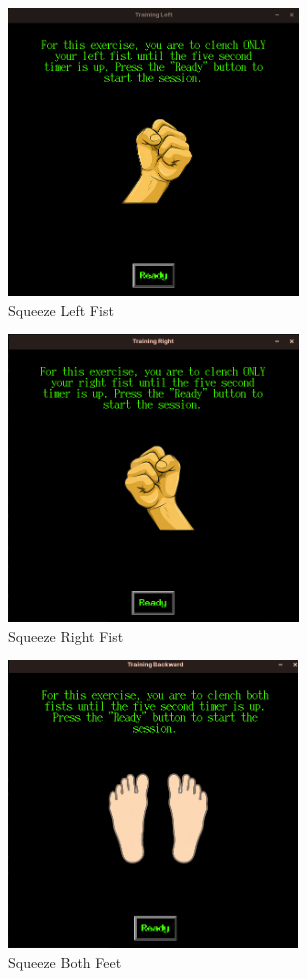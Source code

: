 \documentclass[conference]{IEEEtran}
\begin{document}
\begin{figure}[h]
    \centering
    \includegraphics[keepaspectratio, height=3in]{figs/H/ui4.png}
    \caption{Squeeze Left Fist}
    \label{fig:squeeze_left}
\end{figure}
\begin{figure}[h]
    \centering
    \includegraphics[keepaspectratio, height=3in]{figs/H/ui5.png}
    \caption{Squeeze Right Fist}
    \label{fig:squeeze_right}
\end{figure}
\begin{figure}[h]
    \centering
    \includegraphics[keepaspectratio, height=3in]{figs/H/ui6.png}
    \caption{Squeeze Both Feet}
    \label{fig:squeeze_feet}
\end{figure}
\onecolumn
\end{document}
